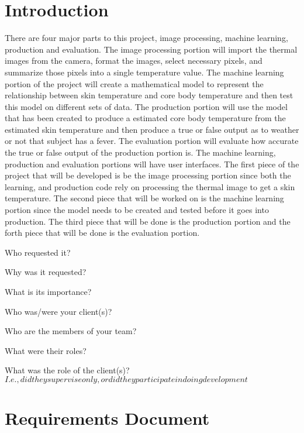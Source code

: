 \documentclass[onecolumn, draftclsnofoot,10pt, compsoc]{IEEEtran}
\begin{document}
	\newpage
	\tableofcontents
	\clearpage
	
	\section{Introduction}
	
	There are four major parts to this project, image processing, machine learning, production and evaluation. The image processing portion will import the thermal images from the camera, format the images, select necessary pixels, and summarize those pixels into a single temperature value. The machine learning portion of the project will create a mathematical model to represent the relationship between skin temperature and core body temperature and then test this model on different sets of data. The production portion will use the model that has been created to produce a estimated core body temperature from the estimated skin temperature and then produce a true or false output as to weather or not that subject has a fever. The evaluation portion will evaluate how accurate the true or false output of the production portion is. The machine learning, production and evaluation portions will have user interfaces. The first piece of the project that will be developed is be the image processing portion since both the learning, and production code rely on processing the thermal image to get a skin temperature. The second piece that will be worked on is the machine learning portion since the model needs to be created and tested before it goes into production. The third piece that will be done is the production portion and the forth piece that will be done is the evaluation portion.
	
	Who requested it?
	
	Why was it requested?
	
	What is its importance?
	
	Who was/were your client(s)?
	
	Who are the members of your team?
	
	What were their roles?
	
	What was the role of the client(s)? \(I.e., did they supervise only, or did 
	they participate in doing development\)
	
	
	\section{Requirements Document}
\end{document}
